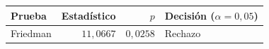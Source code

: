 \begin{resulttable}
\centering\fontsize{8}{10}\selectfont\setlength{\tabcolsep}{3.0pt}
\caption{Contraste global de Friedman para la biblioteca común de 21 descriptores y seis datasets.}
\label{tab:global-primary}
\begin{tabular}{@{}lrrl@{}}
\toprule
Prueba & Estadístico & $p$ & Decisión ($\alpha=0{,}05$) \\
\midrule
Friedman & $11{,}0667$ & $0{,}0258$ & Rechazo \\
\bottomrule
\end{tabular}
\end{resulttable}
\FloatBarrier
